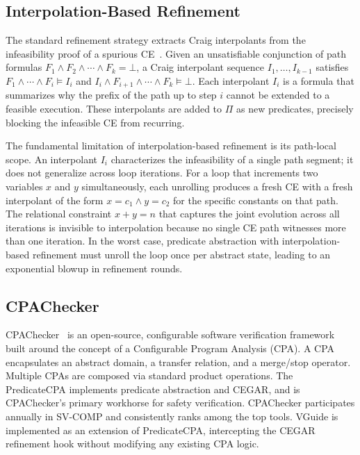 \subsection{Interpolation-Based Refinement}

The standard refinement strategy extracts Craig interpolants from the
infeasibility proof of a spurious CE~\cite{interpolation2003}. Given an unsatisfiable
conjunction of path formulas $F_1 \wedge F_2 \wedge \cdots \wedge F_k = \bot$, a
Craig interpolant sequence $I_1, \ldots, I_{k-1}$ satisfies $F_1 \wedge \cdots \wedge
F_i \models I_i$ and $I_i \wedge F_{i+1} \wedge \cdots \wedge F_k \models \bot$. Each
interpolant $I_i$ is a formula that summarizes why the prefix of the path up to step
$i$ cannot be extended to a feasible execution. These interpolants are added to $\Pi$
as new predicates, precisely blocking the infeasible CE from recurring.

The fundamental limitation of interpolation-based refinement is its path-local scope.
An interpolant $I_i$ characterizes the infeasibility of a single path segment; it does
not generalize across loop iterations. For a loop that increments two variables $x$ and
$y$ simultaneously, each unrolling produces a fresh CE with a fresh interpolant of the
form $x = c_1 \wedge y = c_2$ for the specific constants on that path. The relational
constraint $x + y = n$ that captures the joint evolution across all iterations is
invisible to interpolation because no single CE path witnesses more than one iteration.
In the worst case, predicate abstraction with interpolation-based refinement must
unroll the loop once per abstract state, leading to an exponential blowup in refinement
rounds.

\subsection{CPAChecker}

CPAChecker~\cite{cpachecker2011} is an open-source, configurable software verification
framework built around the concept of a Configurable Program Analysis (CPA). A CPA
encapsulates an abstract domain, a transfer relation, and a merge/stop operator. Multiple
CPAs are composed via standard product operations. The PredicateCPA implements predicate
abstraction and CEGAR, and is CPAChecker's primary workhorse for safety verification.
CPAChecker participates annually in SV-COMP and consistently ranks among the top tools.
VGuide is implemented as an extension of PredicateCPA, intercepting the CEGAR
refinement hook without modifying any existing CPA logic.

